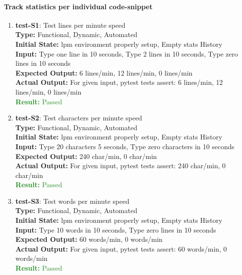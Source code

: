 \documentclass[12pt, titlepage]{article}
\begin{document}
\paragraph{Track statistics per individual code-snippet}
\begin{enumerate}
    \item{\textbf{test-S1}: Test lines per minute speed\\}
    \textbf{Type:} Functional, Dynamic, Automated \\
    \textbf{Initial State:} lpm environment properly setup, Empty stats History\\
    \textbf{Input:} Type one line in 10 seconds, Type 2 lines in 10 seconds, Type zero lines in 10 seconds \\
    \textbf{Expected Output:} 6 lines/min, 12 lines/min, 0 lines/min \\
    \textbf{Actual Output:} For given input, pytest tests assert: 6 lines/min, 12 lines/min, 0 lines/min \\
    \textcolor{ForestGreen}{\textbf{Result:} Passed}

    \item{\textbf{test-S2}: Test characters per minute speed \\}
    \textbf{Type:} Functional, Dynamic, Automated \\
    \textbf{Initial State:} lpm environment properly setup, Empty stats History\\
    \textbf{Input:} Type 20 characters 5 seconds, Type zero characters in 10 seconds\\
    \textbf{Expected Output:} 240 char/min, 0 char/min \\
    \textbf{Actual Output:} For given input, pytest tests assert: 240 char/min, 0 char/min \\
    \textcolor{ForestGreen}{\textbf{Result:} Passed}

    \item{\textbf{test-S3}: Test words per minute speed\\}
    \textbf{Type:} Functional, Dynamic, Automated \\
    \textbf{Initial State:} lpm environment properly setup, Empty stats History\\
    \textbf{Input:} Type 10 words in 10 seconds, Type zero lines in 10 seconds\\
    \textbf{Expected Output:} 60 words/min, 0 words/min \\
    \textbf{Actual Output:} For given input, pytest tests assert: 60 words/min, 0 words/min \\
    \textcolor{ForestGreen}{\textbf{Result:} Passed}


\end{enumerate}
\end{document}
